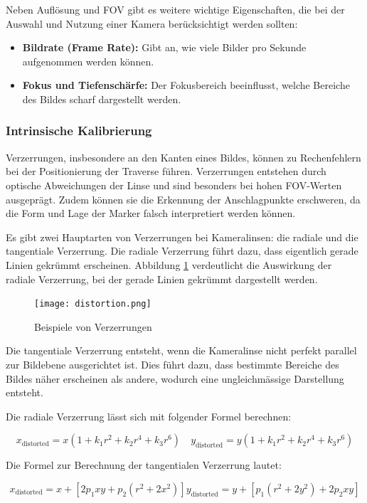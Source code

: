 Neben Auflösung und FOV gibt es weitere wichtige Eigenschaften, die 
bei der Auswahl und Nutzung einer Kamera berücksichtigt werden sollten:

\begin{itemize}
    \item \textbf{Bildrate (Frame Rate):} Gibt an, wie viele Bilder pro Sekunde aufgenommen werden können.
    \item \textbf{Fokus und Tiefenschärfe:} Der Fokusbereich beeinflusst, welche Bereiche des Bildes scharf dargestellt werden.
\end{itemize}


\subsubsection{Intrinsische Kalibrierung}
Verzerrungen, insbesondere an den Kanten eines Bildes, können zu Rechenfehlern 
bei der Positionierung der Traverse führen. Verzerrungen entstehen durch optische 
Abweichungen der Linse und sind besonders bei hohen FOV-Werten ausgeprägt. 
Zudem können sie die Erkennung der Anschlagpunkte erschweren, da die Form und 
Lage der Marker falsch interpretiert werden können.

Es gibt zwei Hauptarten von Verzerrungen bei Kameralinsen: die radiale und die tangentiale Verzerrung.
Die radiale Verzerrung führt dazu, dass eigentlich gerade Linien gekrümmt erscheinen. Abbildung 
\ref{fig:distortion} verdeutlicht die Auswirkung der radiale Verzerrung, bei der gerade Linien gekrümmt
dargestellt werden.

\begin{figure}[H]
    \centering
    \texttt{[image: distortion.png]}
    \caption{Beispiele von Verzerrungen}
    \label{fig:distortion}
\end{figure}

Die tangentiale Verzerrung entsteht, wenn die Kameralinse nicht perfekt parallel zur Bildebene ausgerichtet
ist. Dies führt dazu, dass bestimmte Bereiche des Bildes näher erscheinen als andere, wodurch eine ungleichmässige
Darstellung entsteht. 

Die radiale Verzerrung lässt sich mit folgender Formel berechnen:

\[
x_\text{distorted} = x(1 + k_1r^2 + k_2r^4 + k_3r^6) \quad
y_\text{distorted} = y(1 + k_1r^2 + k_2r^4 + k_3r^6)
\]

Die Formel zur Berechnung der tangentialen Verzerrung lautet:

\[
x_\text{distorted} = x + \left[ 2p_1xy + p_2(r^2 + 2x^2) \right]
y_\text{distorted} = y + \left[ p_1(r^2 + 2y^2) + 2p_2xy \right]
\]


